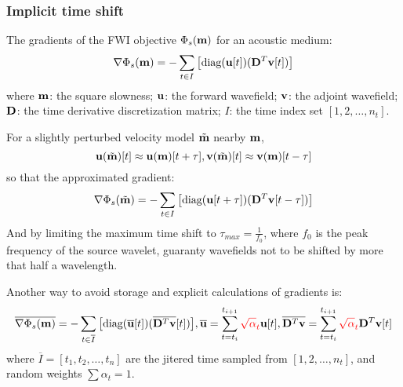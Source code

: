 \subsubsection{Implicit time shift}
The gradients of the FWI objective $\Phi_s(\mathbf{m})$ for an acoustic medium:
\[ \nabla\Phi_s(\mathbf{m})=-\sum_{t\in I}\big[\text{diag}(\mathbf{u}[t])(\mathbf{D}^T\mathbf{v}[t])\big] \]
where $\mathbf{m}$: the square slowness; $\mathbf{u}$: the forward wavefield; $\mathbf{v}$: the adjoint wavefield; $\mathbf{D}$: the time derivative discretization matrix; $I$: the time index set $[1,2,\ldots,n_t]$.\par
For a slightly perturbed velocity model $\tilde{\mathbf{m}}$ nearby $\mathbf{m}$,
\[ \mathbf{u}(\tilde{\mathbf{m}})[t]\approx\mathbf{u}(\mathbf{m})[t+\tau],\mathbf{v}(\tilde{\mathbf{m}})[t]\approx\mathbf{v}(\mathbf{m})[t-\tau] \]
so that the approximated gradient:
\[ \nabla\Phi_s(\tilde{\mathbf{m}})=-\sum_{t\in I}\big[\text{diag}(\mathbf{u}[t+\tau])(\mathbf{D}^T\mathbf{v}[t-\tau])\big] \]
And by limiting the maximum time shift to $\tau_{max}=\frac{1}{f_0}$, where $f_0$ is the peak frequency of the source wavelet, guaranty wavefields not to be shifted by more that half a wavelength.\par
Another way to avoid storage and explicit calculations of gradients is:
\[ \overline{\nabla\Phi_s(\mathbf{m})}=-\sum_{t\in\overline I}\big[\text{diag}(\overline{\mathbf{u}}[t])(\overline{\mathbf{D}^T\mathbf{v}}[t])\big],\overline{\mathbf{u}}=\sum_{t=t_i}^{t_{i+1}}{\color{red}\sqrt\alpha_t}\mathbf{u}[t], \overline{\mathbf{D}^T\mathbf{v}}=\sum_{t=t_i}^{t_{i+1}}{\color{red}\sqrt\alpha_t}\mathbf{D}^T\mathbf{v}[t] \]
where $\overline I=[t_1,t_2,\ldots,t_n]$ are the jitered time sampled from $[1,2,\ldots,n_t]$, and random weights $\sum\alpha_t=1$.\par

